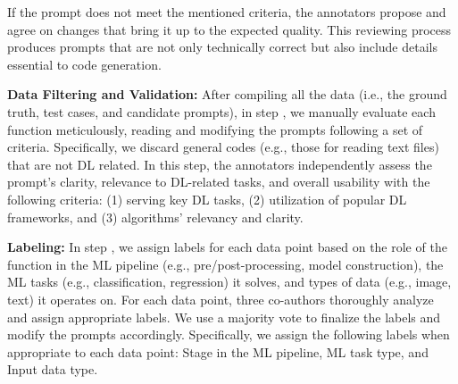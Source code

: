 If the prompt does not meet the
mentioned criteria, the annotators propose and agree on changes that 
bring it up to the expected quality.
This reviewing process 
produces prompts that are 
not only 
technically correct 
but also include details essential to
code generation.

\textbf{Data Filtering and Validation:} After compiling all the data (i.e., the ground truth, test cases, and candidate prompts), in step , we manually evaluate each function meticulously, reading and modifying the prompts following a set of criteria. Specifically, we discard general codes (e.g., those for reading text files) that are not DL related.
In this step, the annotators independently assess the
prompt’s clarity, relevance to DL-related tasks, and overall usability 
with the following
criteria: (1) serving key DL tasks, (2) utilization of popular DL frameworks, and (3) algorithms' relevancy and clarity.

\textbf{Labeling:} In step , we assign labels for each data point based on the role of the function in the ML pipeline (e.g., pre/post-processing, model construction), the ML tasks (e.g., classification, regression) it solves, and types of data (e.g., image, text) it operates on. For each data point, three co-authors thoroughly analyze and assign appropriate labels. We use a majority vote to finalize the labels and modify the prompts accordingly. Specifically, we assign the following labels when appropriate to each data point: Stage in the ML pipeline, ML task type, and Input data type.





